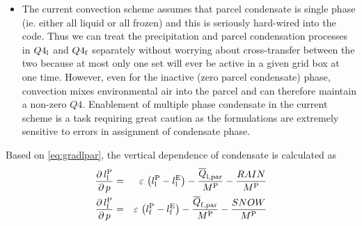\documentclass{UMDP_article}
\newcommand{\lsubsup}[2]{\ensuremath{l_{\rm{#1}}^{\rm{#2}}}}
\newcommand{\ov}{\overline}
\newcommand{\lp}{\left(}
\newcommand{\rp}{\right)}
\newcommand{\pardbyd}[2]{\ensuremath{\frac{\partial \, #1}{\partial \, #2}}}
\begin{document}
\begin{itemize}
\item{The current convection scheme assumes that parcel
condensate is single phase
(ie. either all liquid or all frozen) and this is seriously hard-wired into the
code. Thus we can treat the precipitation and parcel condensation 
processes in $ Q4_{\rm{l}} $ and $ Q4_{\rm{f}} $ separately without worrying
about cross-transfer between the two because at most only one set will ever be
active in a given grid box at one time. However, even for the inactive (zero
parcel condensate) phase, convection mixes environmental air into the
parcel and
can therefore maintain a non-zero $Q4$. Enablement of multiple phase condensate
in the current scheme is a task requiring great caution as the formulations
are extremely sensitive to errors in assignment of condensate phase.}
\end{itemize}

Based on \ref{eq:gradlpar}, the vertical dependence of condensate is
calculated as
%
\begin{eqnarray}
\pardbyd{\lsubsup{l}{P}}{p} & = & \varepsilon \, 
\lp { \lsubsup{l}{P} - \lsubsup{l}{E} } \rp - 
\frac{{\ov{Q}}_{\rm{l, par}}}{M^{\rm{P}}} - 
\frac{RAIN}{M^{\rm{P}}}  \label{eq:vertparl} \\
\pardbyd{\lsubsup{f}{P}}{p} & = & \varepsilon \,  
\lp { \lsubsup{f}{P} - \lsubsup{f}{E} } \rp - 
\frac{{\ov{Q}}_{\rm{f, par}}}{M^{\rm{P}}} - 
\frac{SNOW}{M^{\rm{P}}}\label{eq:vertparf} 
\end{eqnarray}
\end{document}
